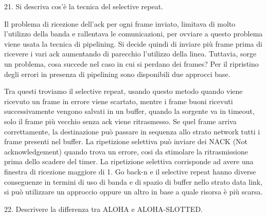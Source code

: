 21.	Si descriva cos'è la tecnica del selective repeat.

Il problema di ricezione dell’ack per ogni frame inviato, limitava di molto l’utilizzo della banda e rallentava le comunicazioni, per ovviare a questo problema viene usata la tecnica di pipelining. Si decide quindi di inviare più frame prima di ricevere i vari ack aumentando di parecchio l’utilizzo della linea. Tuttavia, sorge un problema, cosa succede nel caso in cui si perdano dei frames? Per il ripristino degli errori in presenza di pipelining sono disponibili due approcci base.

Tra questi troviamo il selective repeat, usando questo metodo quando viene ricevuto un frame in errore viene scartato, mentre i frame buoni ricevuti successivamente vengono salvati in un buffer, quando la sorgente va in timeout, solo il frame più vecchio senza ack viene ritrasmesso. Se quel frame arriva correttamente, la destinazione può passare in sequenza allo strato network tutti i frame presenti nel buffer.
La ripetizione selettiva può inviare dei NACK (Not acknowledgement) quando trova un errore, cosi da stimolare la ritrasmissione prima dello scadere del timer.
La ripetizione selettiva corrisponde ad avere una finestra di ricezione maggiore di 1.
Go back-n e il selective repeat hanno diverse conseguenze in termini di uso di banda e di spazio di buffer nello strato data link, si può utilizzare un approccio oppure un altro in base a quale risorsa è più scarsa.
 
22.	Descrivere la differenza tra ALOHA e ALOHA-SLOTTED.

